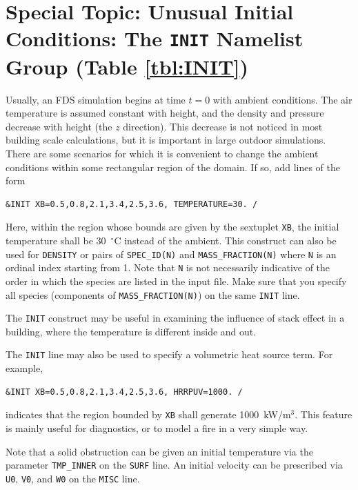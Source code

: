 \documentclass[11pt]{book}
\newcommand{\ct}{\tt\small}
\begin{document}
\clearpage


\section{Special Topic: Unusual Initial Conditions: The \texorpdfstring{{\tt INIT}}{INIT} Namelist Group (Table \ref{tbl:INIT})}
\label{info:INIT}

Usually, an FDS simulation begins at time $t=0$ with ambient conditions. The air temperature is
assumed constant with height, and the density and pressure decrease with height (the $z$ direction). This
decrease is not noticed in most building scale calculations, but it is important in large outdoor
simulations. There are some scenarios for which it is convenient to change the ambient conditions within some
rectangular region of the domain. If so, add lines of the form

\footnotesize
\begin{verbatim}
&INIT XB=0.5,0.8,2.1,3.4,2.5,3.6, TEMPERATURE=30. /
\end{verbatim}

\normalsize
\noindent Here, within the region whose bounds are given by the sextuplet {\ct XB}, the initial temperature shall be 30~$^\circ$C instead of the ambient.
This construct can also be used for {\ct DENSITY} or pairs of {\ct SPEC\_ID(N)} and {\ct MASS\_FRACTION(N)} where {\ct N} is an ordinal index starting from 1. Note that
{\ct N} is not necessarily indicative of the order in which the species are listed in the input file.
Make sure that you specify all species (components of {\ct MASS\_FRACTION(N)}) on the same {\ct INIT} line.

The {\ct INIT} construct may be useful in examining the influence of
stack effect in a building, where the temperature
is different inside and out.

The {\ct INIT} line may also be used to specify a volumetric heat source term. For example,

\footnotesize
\begin{verbatim}
&INIT XB=0.5,0.8,2.1,3.4,2.5,3.6, HRRPUV=1000. /
\end{verbatim}

\normalsize
\noindent indicates that the region bounded by {\ct XB} shall generate 1000~kW/m$^3$. This feature is mainly useful for diagnostics, or to model a fire in a very simple way.

Note that a solid obstruction can be given an initial temperature via the
parameter {\ct TMP\_INNER} on the {\ct SURF} line. An initial velocity
can be prescribed via {\ct U0}, {\ct V0}, and {\ct W0} on the {\ct MISC} line.
\end{document}
